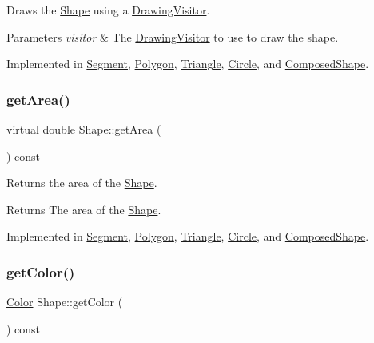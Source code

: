 Draws the \hyperlink{class_shape}{Shape} using a \hyperlink{class_drawing_visitor}{Drawing\+Visitor}. 
\begin{DoxyParams}{Parameters}
{\em visitor} & The \hyperlink{class_drawing_visitor}{Drawing\+Visitor} to use to draw the shape. \\
\hline
\end{DoxyParams}


Implemented in \hyperlink{class_segment_ad7b3641fc3670b1fba9cd97c2c40e3ba}{Segment}, \hyperlink{class_polygon_a245c526a6a65ea99f5549fe5243006d0}{Polygon}, \hyperlink{class_triangle_a1fa834143ed718605959a227eba573b3}{Triangle}, \hyperlink{class_circle_a4c2dc8107eab8b562328743cafdddd79}{Circle}, and \hyperlink{class_composed_shape_a30f69734aa983bca56574ff4e5fd1723}{Composed\+Shape}.

\hypertarget{class_shape_ad9454ee04617290547e7529180b1beae}{}\label{class_shape_ad9454ee04617290547e7529180b1beae} 
\subsubsection{\texorpdfstring{get\+Area()}{getArea()}}
{\footnotesize\ttfamily virtual double Shape\+::get\+Area (\begin{DoxyParamCaption}{ }\end{DoxyParamCaption}) const\hspace{0.3cm}{\ttfamily [pure virtual]}}

Returns the area of the \hyperlink{class_shape}{Shape}. \begin{DoxyReturn}{Returns}
The area of the \hyperlink{class_shape}{Shape}. 
\end{DoxyReturn}


Implemented in \hyperlink{class_segment_af019f332cb32a21a1f9b7ae5acd7b4e7}{Segment}, \hyperlink{class_polygon_ae1ae9dd5e5613f119af3e31488427b01}{Polygon}, \hyperlink{class_triangle_a5f7fa9fd678345063e50e3458d943a9b}{Triangle}, \hyperlink{class_circle_a7bfb5ab5c8d4f11890407a2483ad61ee}{Circle}, and \hyperlink{class_composed_shape_a89b3457e1699afeb86805afad627d2c7}{Composed\+Shape}.

\hypertarget{class_shape_a6ab685fc0e6aeec5d2e9743f5ecd66a4}{}\label{class_shape_a6ab685fc0e6aeec5d2e9743f5ecd66a4} 
\subsubsection{\texorpdfstring{get\+Color()}{getColor()}}
{\footnotesize\ttfamily \hyperlink{class_color}{Color} Shape\+::get\+Color (\begin{DoxyParamCaption}{ }\end{DoxyParamCaption}) const\hspace{0.3cm}{\ttfamily [virtual]}}

